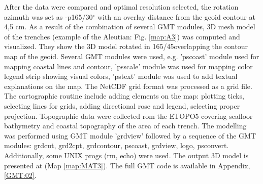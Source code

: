 \documentclass[11pt,a4paper]{report}
\begin{document}
{After the data were compared and optimal resolution selected, the rotation azimuth was set as -p165/30$^{\circ}$ with an overlay distance from the  geoid contour at 4,5 cm. As a result of the combination of several \ac{GMT} modules, 3D mesh model of the trenches (example of the Aleutian: Fig. \ref{map:A3}) was computed and visualized. They show the 3D model rotated in 165/45\degree overlapping the contour map of the geoid. Several \ac{GMT} modules were used, e.g. 'pscoast' module used for mapping coastal lines and contour, 'psscale' module was used for mapping color legend strip showing visual colors, 'pstext' module was used to add textual explanations on the map. The \ac{NetCDF} grid format \cite{RewDavis1990} was processed as a grid file. The cartographic routine include adding elements on the map: plotting ticks, selecting lines for grids, adding directional rose and legend, selecting proper projection. Topographic data were collected rom the \ac{ETOPO5} covering seafloor bathymetry and coastal topography of the area of each trench. The modelling was performed using \ac{GMT} module 'grdview' followed by a sequence of the \ac{GMT} modules: grdcut, grd2cpt, grdcontour, pscoast, grdview, logo, psconvert. Additionally, some UNIX progs (rm, echo) were used. The output 3D model is presented at (Map \ref{map:MAT3}). The full GMT code is available in Appendix, \ref{GMT:02}.

}
\end{document}
